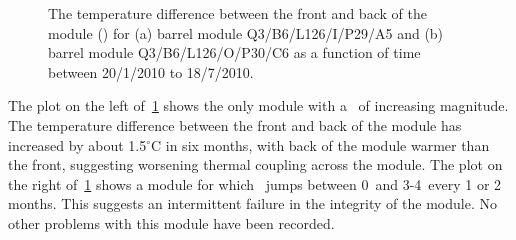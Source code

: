 \begin{figure}[h]
 	\centering
  \caption{The temperature difference between the front and back of the module
  (\deltat) for (a) barrel module Q3/B6/L126/I/P29/A5 and (b) barrel module
  Q3/B6/L126/O/P30/C6 as a function of time between 20/1/2010 to
  18/7/2010.}
	\label{fig:pm_ev_dt}
\end{figure}

The plot on the left of~\ref{fig:pm_ev_dt} shows the only module with a \deltat\
of increasing magnitude. The temperature difference between the front and back
of the module has increased by about 1.5$^\circ$C in six months, with back of
the module warmer than the front, suggesting worsening thermal coupling across
the module. The plot on the right of~\ref{fig:pm_ev_dt} shows a
module for which \deltat\ jumps between 0\dc\ and 3-4\dc\ every 1 or 2 months.
This suggests an intermittent failure in the integrity of the module. No other problems
with this module have been recorded.

